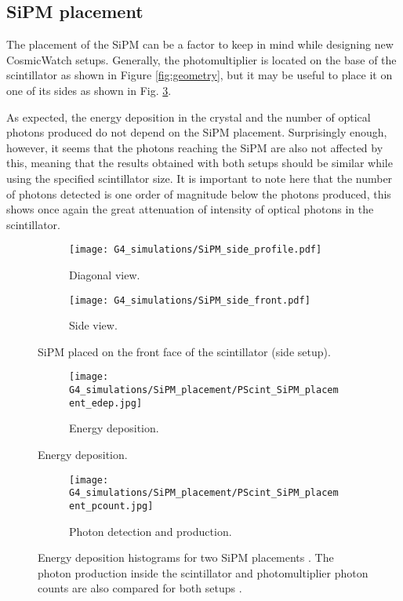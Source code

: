 \subsection{SiPM placement}\label{sec:SiPM_placement}

The placement of the SiPM can be a factor to keep in mind while designing new CosmicWatch setups. Generally, the photomultiplier is located on the base of the scintillator as shown in Figure \ref{fig:geometry}, but it may be useful to place it on one of its sides as shown in Fig. \ref{fig:SiPM_side}.

As expected, the energy deposition in the crystal and the number of optical photons produced do not depend on the SiPM placement. Surprisingly enough, however, it seems that the photons reaching the SiPM are also not affected by this, meaning that the results obtained with both setups should be similar while using the specified scintillator size. It is important to note here that the number of photons detected is one order of magnitude below the photons produced, this shows once again the great attenuation of intensity of optical photons in the scintillator.

\begin{figure}[H]
  \centering
  \begin{subfigure}[t]{0.48\textwidth}
    \texttt{[image: G4\_simulations/SiPM\_side\_profile.pdf]}
    \caption{\label{sfig:SiPM_side_profile}Diagonal view.}
  \end{subfigure}
  \hfill
  \begin{subfigure}[t]{0.48\textwidth}
    \texttt{[image: G4\_simulations/SiPM\_side\_front.pdf]}
    \caption{\label{sfig:SiPM_side_front}Side view.}
  \end{subfigure}
  \caption{\label{fig:SiPM_side}SiPM placed on the front face of the scintillator (side setup).}
\end{figure}

\begin{figure}[H]
  \centering
  \begin{subfigure}[t]{.98\textwidth}
    \texttt{[image: G4\_simulations/SiPM\_placement/PScint\_SiPM\_placement\_edep.jpg]}
    \caption{\label{sfig:PScint_SiPM_place_edep}Energy deposition.}
  \end{subfigure}
\end{figure}
\begin{figure}[H]\ContinuedFloat
  \begin{subfigure}[t]{.98\textwidth}
    \texttt{[image: G4\_simulations/SiPM\_placement/PScint\_SiPM\_placement\_pcount.jpg]}
    \caption{\label{sfig:PScint_SiPM_place_pcount}Photon detection and production.}
  \end{subfigure}
  \caption{\label{fig:PScint_SiPM_place}Energy deposition histograms for two SiPM placements . The photon production inside the scintillator and photomultiplier photon counts are also compared for both setups .}
\end{figure}

